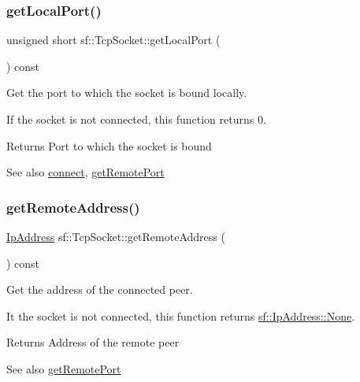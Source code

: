 \subsubsection{\texorpdfstring{getLocalPort()}{getLocalPort()}}
{\footnotesize\ttfamily unsigned short sf\+::\+Tcp\+Socket\+::get\+Local\+Port (\begin{DoxyParamCaption}{ }\end{DoxyParamCaption}) const}



Get the port to which the socket is bound locally. 

If the socket is not connected, this function returns 0.

\begin{DoxyReturn}{Returns}
Port to which the socket is bound
\end{DoxyReturn}
\begin{DoxySeeAlso}{See also}
\mbox{\hyperlink{classsf_1_1_tcp_socket_a68cd42d5ab70ab54b16787f555951c40}{connect}}, \mbox{\hyperlink{classsf_1_1_tcp_socket_a93bced0afd4b1c60797a85725be04951}{get\+Remote\+Port}} \begin{DoxyVerb}\end{DoxyVerb}
 
\end{DoxySeeAlso}
\mbox{\label{classsf_1_1_tcp_socket_aa8579c203b1fd21beb74d7f76444a94c}} 
\subsubsection{\texorpdfstring{getRemoteAddress()}{getRemoteAddress()}}
{\footnotesize\ttfamily \mbox{\hyperlink{classsf_1_1_ip_address}{Ip\+Address}} sf\+::\+Tcp\+Socket\+::get\+Remote\+Address (\begin{DoxyParamCaption}{ }\end{DoxyParamCaption}) const}



Get the address of the connected peer. 

It the socket is not connected, this function returns \mbox{\hyperlink{classsf_1_1_ip_address_a4619b4abbe3c8fef056e7299db967404}{sf\+::\+Ip\+Address\+::\+None}}.

\begin{DoxyReturn}{Returns}
Address of the remote peer
\end{DoxyReturn}
\begin{DoxySeeAlso}{See also}
\mbox{\hyperlink{classsf_1_1_tcp_socket_a93bced0afd4b1c60797a85725be04951}{get\+Remote\+Port}} \begin{DoxyVerb}\end{DoxyVerb}
 
\end{DoxySeeAlso}
\mbox{\label{classsf_1_1_tcp_socket_a93bced0afd4b1c60797a85725be04951}} 
